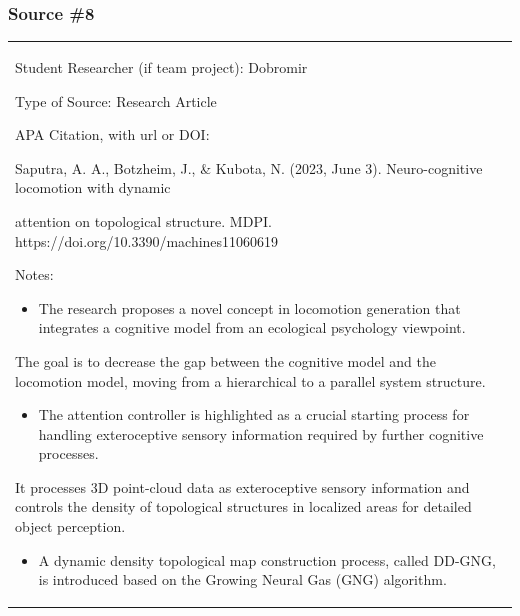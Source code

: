 \subsubsection{\texorpdfstring{\hfill\break
}{ }}\label{section-5}

\subsubsection{\texorpdfstring{\textbf{Source
\#8}}{Source \#8}}\label{source-8}

\begin{longtable}[]{@{}
  >{\raggedright\arraybackslash}p{}@{}}
\toprule\noalign{}

Student Researcher (if team project): Dobromir


Type of Source: Research Article


APA Citation, with url or DOI:

Saputra, A. A., Botzheim, J., \& Kubota, N. (2023, June 3).
Neuro-cognitive locomotion with dynamic

attention on topological structure. MDPI.
https://doi.org/10.3390/machines11060619


Notes:

\begin{itemize}
\item
  The research proposes a novel concept in locomotion generation that
  integrates a cognitive model from an ecological psychology viewpoint.
\end{itemize}

The goal is to decrease the gap between the cognitive model and the
locomotion model, moving from a hierarchical to a parallel system
structure.

\begin{itemize}
\item
  The attention controller is highlighted as a crucial starting process
  for handling exteroceptive sensory information required by further
  cognitive processes.
\end{itemize}

It processes 3D point-cloud data as exteroceptive sensory information
and controls the density of topological structures in localized areas
for detailed object perception.

\begin{itemize}
\item
  A dynamic density topological map construction process, called DD-GNG,
  is introduced based on the Growing Neural Gas (GNG) algorithm.
\end{itemize}


\end{longtable}
